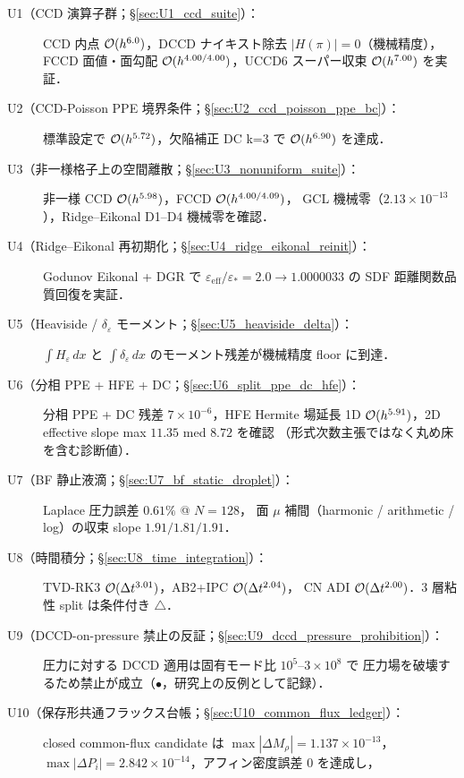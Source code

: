 \begin{description}
  \item[U1（CCD 演算子群；§\ref{sec:U1_ccd_suite}）：]
        CCD 内点 $\mathcal{O}(h^{6.0})$，DCCD ナイキスト除去 $|H(\pi)|=0$（機械精度），
        FCCD 面値・面勾配 $\mathcal{O}(h^{4.00/4.00})$，UCCD6 スーパー収束 $\mathcal{O}(h^{7.00})$ を実証．
  \item[U2（CCD-Poisson PPE 境界条件；§\ref{sec:U2_ccd_poisson_ppe_bc}）：]
        標準設定で $\mathcal{O}(h^{5.72})$，欠陥補正 DC k=3 で $\mathcal{O}(h^{6.90})$ を達成．
  \item[U3（非一様格子上の空間離散；§\ref{sec:U3_nonuniform_suite}）：]
        非一様 CCD $\mathcal{O}(h^{5.98})$，FCCD $\mathcal{O}(h^{4.00/4.09})$，
        GCL 機械零（$2.13\times 10^{-13}$），Ridge--Eikonal D1--D4 機械零を確認．
  \item[U4（Ridge--Eikonal 再初期化；§\ref{sec:U4_ridge_eikonal_reinit}）：]
        Godunov Eikonal + DGR で $\varepsilon_\mathrm{eff}/\varepsilon_* = 2.0\to 1.0000033$ の
        SDF 距離関数品質回復を実証．
  \item[U5（Heaviside / $\delta_\varepsilon$ モーメント；§\ref{sec:U5_heaviside_delta}）：]
        $\int H_\varepsilon\,dx$ と $\int \delta_\varepsilon\,dx$ のモーメント残差が機械精度 floor に到達．
  \item[U6（分相 PPE + HFE + DC；§\ref{sec:U6_split_ppe_dc_hfe}）：]
        分相 PPE + DC 残差 $7\times 10^{-6}$，HFE Hermite 場延長
        1D $\mathcal{O}(h^{5.91})$，2D effective slope max $11.35$ med $8.72$ を確認
        （形式次数主張ではなく丸め床を含む診断値）．
  \item[U7（BF 静止液滴；§\ref{sec:U7_bf_static_droplet}）：]
        Laplace 圧力誤差 $0.61\%$ @ $N=128$，
        面 $\mu$ 補間（harmonic / arithmetic / log）の収束 slope $1.91/1.81/1.91$．
  \item[U8（時間積分；§\ref{sec:U8_time_integration}）：]
        TVD-RK3 $\mathcal{O}(\Delta t^{3.01})$，AB2+IPC $\mathcal{O}(\Delta t^{2.04})$，
        CN ADI $\mathcal{O}(\Delta t^{2.00})$．3 層粘性 split は条件付き $\triangle$．
  \item[U9（DCCD-on-pressure 禁止の反証；§\ref{sec:U9_dccd_pressure_prohibition}）：]
        圧力に対する DCCD 適用は固有モード比 $10^{5}$--$3\times 10^{8}$ で
        圧力場を破壊するため禁止が成立（$\bullet$，研究上の反例として記録）．
  \item[U10（保存形共通フラックス台帳；§\ref{sec:U10_common_flux_ledger}）：]
        closed common-flux candidate は $\max|\Delta M_\rho|=1.137\times10^{-13}$，
        $\max|\Delta P_i|=2.842\times10^{-14}$，アフィン密度誤差 $0$ を達成し，

\end{description}
